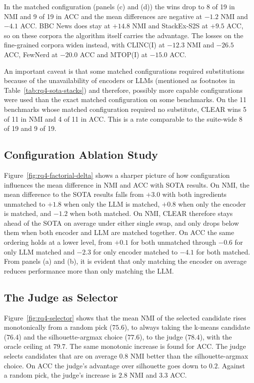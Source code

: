 \documentclass[11pt,a4paper,oneside]{report}
\begin{document}
In the matched configuration (panels (c) and (d)) the wins drop to 8 of 19 in NMI and 9 of 19 in ACC and the mean differences are negative at $-1.2$ NMI and $-4.1$ ACC. BBC News does stay at $+14.8$ NMI and StackEx-S2S at $+9.5$ ACC, so on these corpora the algorithm itself carries the advantage. The losses on the fine-grained corpora widen instead, with CLINC(I) at $-12.3$ NMI and $-26.5$ ACC, FewNerd at $-20.0$ ACC and MTOP(I) at $-15.0$ ACC.

An important caveat is that some matched configurations required substitutions because of the unavailability of encoders or LLMs (mentioned as footnotes in Table~\ref{tab:rq4-sota-stacks}) and therefore, possibly more capable configurations were used than the exact matched configuration on some benchmarks. On the 11 benchmarks whose matched configuration required no
substitute, CLEAR wins 5 of 11 in NMI and 4 of 11 in ACC. This is a rate comparable to
the suite-wide 8 of 19 and 9 of 19.

\subsection{Configuration Ablation Study}

Figure~\ref{fig:rq4-factorial-delta} shows a sharper picture of how configuration influences the mean difference in NMI and ACC with SOTA results. On NMI, the mean difference to the SOTA results falls from $+3.0$ with both ingredients unmatched to $+1.8$ when only the LLM is matched, $+0.8$ when only the encoder is matched, and $-1.2$ when both matched. On NMI, CLEAR therefore stays ahead of the SOTA on average under either single swap, and only drops below them when both encoder and LLM are matched together. On ACC the same ordering holds at a lower level, from $+0.1$ for both unmatched through $-0.6$ for only LLM matched and $-2.3$ for only encoder matched to $-4.1$ for both matched. From panels (a) and (b), it is evident that only matching the encoder on average reduces performance more than only matching the LLM.

\subsection{The Judge as Selector}\label{sec:results-rq4-selector}


Figure~\ref{fig:rq4-selector} shows that the mean NMI of the
selected candidate rises monotonically from a random pick ($75.6$), to always taking the k-means candidate ($76.4$) and the silhouette-argmax choice ($77.6$), to the judge ($78.4$), with the oracle ceiling at $79.7$. The same monotonic increase is found for ACC. The judge selects candidates that are on average $0.8$ NMI better than the
silhouette-argmax choice. On ACC the judge's advantage over silhouette goes down to $0.2$. Against a random pick, the judge's increase is $2.8$ NMI and $3.3$ ACC.
\end{document}

